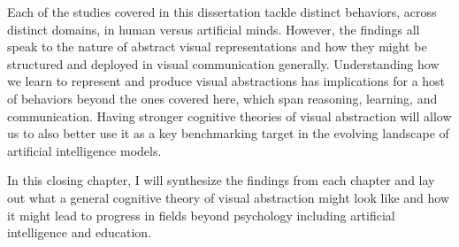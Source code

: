\documentclass{Dissertate}
\begin{document}
Each of the studies covered in this dissertation tackle distinct behaviors, across distinct domains, in human versus artificial minds.
However, the findings all speak to the nature of abstract visual representations and how they might be structured and deployed in visual communication generally.
Understanding how we learn to represent and produce visual abstractions has implications for a host of behaviors beyond the ones covered here, which span reasoning, learning, and communication.
Having stronger cognitive theories of visual abstraction will allow us to also better use it as a key benchmarking target in the evolving landscape of artificial intelligence models.

In this closing chapter, I will synthesize the findings from each chapter and lay out what a general cognitive theory of visual abstraction might look like and how it might lead to progress in fields beyond psychology including artificial intelligence and education.

% 


% 
\end{document}
